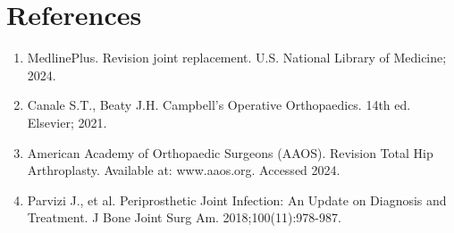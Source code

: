\section*{References}
\begin{enumerate}
  \item MedlinePlus. Revision joint replacement. U.S. National Library of Medicine; 2024.
  
  \item Canale S.T., Beaty J.H. Campbell's Operative Orthopaedics. 14th ed. Elsevier; 2021.
  
  \item American Academy of Orthopaedic Surgeons (AAOS). Revision Total Hip Arthroplasty. Available at: www.aaos.org. Accessed 2024.
  
  \item Parvizi J., et al. Periprosthetic Joint Infection: An Update on Diagnosis and Treatment. J Bone Joint Surg Am. 2018;100(11):978-987.
\end{enumerate}

\clearpage
